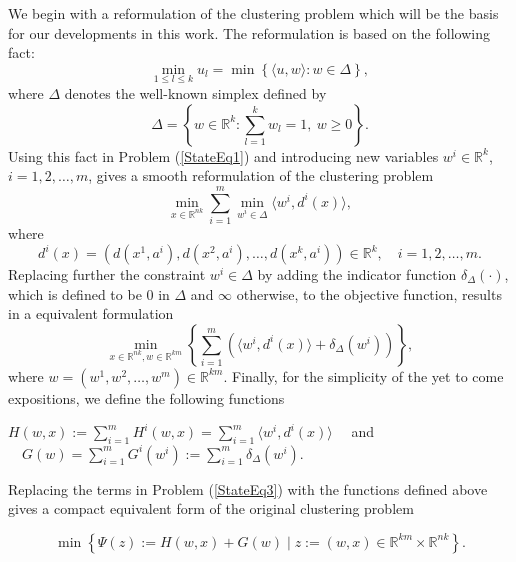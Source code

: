 We begin with a reformulation of the clustering problem which will be the basis for our developments in this work. The reformulation is based on the following fact:
\begin{equation*}
	\min\limits_{1 \leq l \leq k} u_l = \min \left\lbrace \langle u,w \rangle : w \in \Delta \right\rbrace ,
\end{equation*}
where $\Delta$ denotes the well-known simplex defined by
\begin{equation*}
	\Delta = \left\lbrace w \in \mathbb{R}^k : \sum\limits_{l=1}^{k} w_l = 1, \: w \geq 0 \right\rbrace .
\end{equation*}
Using this fact in Problem (\ref{StateEq1}) and introducing new variables $w^i \in \mathbb{R}^k$, $i=1,2, \ldots, m$, gives a smooth reformulation of the clustering problem
\begin{equation}
	\min\limits_{x \in \mathbb{R}^{nk}} \sum\limits_{i=1}^{m} \min\limits_{w^i \in \Delta} \langle w^i , d^i(x) \rangle , \label{StateEq2}
\end{equation}
where 
\begin{equation}
d^{i}(x) = (d(x^1,a^i), d(x^2,a^i), \ldots , d(x^k,a^i)) \in \mathbb{R}^k, \quad i=1, 2, \ldots , m. \label{d^i_def}
\end{equation}
Replacing further the constraint $w^i \in \Delta$ by adding the indicator function $\delta_{\Delta}(\cdot)$, which is defined to be $0$ in $\Delta$ and $\infty$ otherwise, to the objective function, results in a equivalent formulation
\begin{equation}
	\min\limits_{x \in \mathbb{R}^{nk} , w \in \mathbb{R}^{km}} \left\lbrace \sum\limits_{i=1}^{m} \left( \langle w^i , d^i(x) \rangle + \delta_{\Delta}(w^i) \right) \right\rbrace , \label{StateEq3}
\end{equation}
where $w = (w^1, w^2, \ldots , w^m) \in \mathbb{R}^{km}$.
Finally, for the simplicity of the yet to come expositions, we define the following functions
\begin{center}
$H(w,x) := \sum\limits_{i=1}^{m} H^i(w,x) = \sum\limits_{i=1}^{m} \langle w^i , d^i(x) \rangle \quad$ and $\quad G(w) = \sum\limits_{i=1}^{m} G^i(w^i) := \sum\limits_{i=1}^{m} \delta_{\Delta}(w^i) .$
\end{center}

Replacing the terms in Problem (\ref{StateEq3}) with the functions defined above gives a compact equivalent form of the original clustering problem

\begin{equation}
	\min \left\lbrace \Psi(z) := H(w,x) + G(w) \mid z := (w,x) \in \mathbb{R}^{km} \times \mathbb{R}^{nk} \right\rbrace . \label{StateEq4}
\end{equation}

